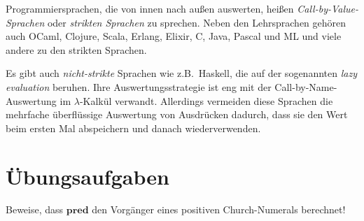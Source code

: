 Programmiersprachen, die von innen nach außen auswerten, heißen
\textit{Call-by-Value-Sprachen} oder
\textit{strikten Sprachen} zu sprechen.  Neben
den Lehrsprachen gehören auch OCaml, Clojure, Scala, Erlang, Elixir,
C, Java, Pascal und ML und viele andere zu den strikten Sprachen.

Es gibt auch \textit{nicht-strikte}
Sprachen wie z.B.\ Haskell,
die auf der sogenannten \textit{lazy evaluation} beruhen.  Ihre
Auswertungsstrategie ist eng mit der Call-by-Name-Auswertung im
$\lambda$-Kalkül verwandt.  Allerdings vermeiden diese Sprachen die
mehrfache überflüssige Auswertung von Ausdrücken dadurch, dass sie den
Wert beim ersten Mal abspeichern und danach wiederverwenden.

\section*{Übungsaufgaben}



\begin{aufgabe}\label{ex:pred}
  Beweise, dass $\mathbf{pred}$ den Vorgänger eines
  positiven Church-Numerals berechnet!
\end{aufgabe}

